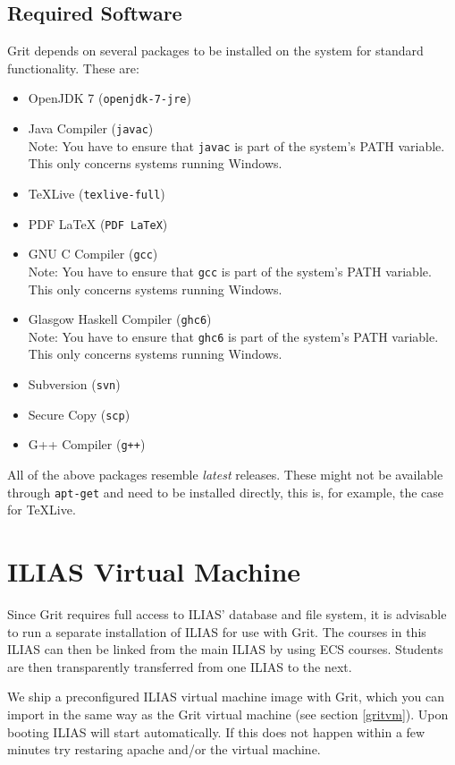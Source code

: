 \documentclass[10pt,a4paper, titlepage, toc=idx]{scrreprt}
\theoremstyle{definition}
\theoremstyle{plain}
\newcommand*{\product}{Grit}
\begin{document}
	\subsection{Required Software}
	\product{} depends on several packages to be installed on the
        system for standard functionality. These are:
	\begin{itemize}
        \item OpenJDK 7 ({\tt openjdk-7-jre})
        \item Java Compiler ({\tt javac}) \\
          Note: You have to ensure that {\tt javac} is part of the
          system's PATH variable. This only concerns systems running
          Windows.
        \item TeXLive ({\tt texlive-full})
        \item PDF LaTeX ({\tt PDF LaTeX})
        \item GNU C Compiler ({\tt gcc})\\
          Note: You have to ensure that {\tt gcc} is part of the
          system's PATH variable. This only concerns systems running
          Windows.
        \item Glasgow Haskell Compiler ({\tt ghc6}) \\
          Note: You have to ensure that {\tt ghc6} is part of the
          system's PATH variable. This only concerns systems running
          Windows.
        \item Subversion ({\tt svn})
        \item Secure Copy ({\tt scp})
        \item G++ Compiler ({\tt g++})
	\end{itemize}
	All of the above packages resemble {\it latest}
        releases. These might not be available through {\tt apt-get}
        and need to be installed directly, this is, for example, the
        case for TeXLive.
	\section{ILIAS Virtual Machine}
        Since \product{} requires full access to ILIAS' database and
        file system, it is advisable to run a separate installation of
        ILIAS for use with \product{}. The courses in this ILIAS can
        then be linked from the main ILIAS by using ECS
        courses. Students are then transparently transferred from one
        ILIAS to the next.

        We ship a preconfigured ILIAS virtual machine image with
        \product{}, which you can import in the same way as the
        \product{} virtual machine (see section \ref{gritvm}). Upon
        booting ILIAS will start automatically. If this does not
        happen within a few minutes try restaring apache and/or the
        virtual machine.
        
\end{document}
